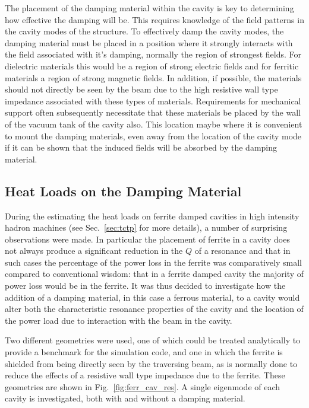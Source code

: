 The placement of the damping material within the cavity is key to determining how effective the damping will be. This requires knowledge of the field patterns in the cavity modes of the structure. To effectively damp the cavity modes, the damping material must be placed in a position where it strongly interacts with the field associated with it's damping, normally the region of strongest fields. For dielectric materials this would be a region of strong electric fields and for ferritic materials a region of strong magnetic fields. In addition, if possible, the materials should not directly be seen by the beam due to the high resistive wall type impedance associated with these types of materials. Requirements for mechanical support often subsequently necessitate that these materials be placed by the wall of the vacuum tank of the cavity also. This location maybe where it is convenient to mount the damping materials, even away from the location of the cavity mode if it can be shown that the induced fields will be absorbed by the damping material.

\subsection{Heat Loads on the Damping Material}

During the estimating the heat loads on ferrite damped cavities in high intensity hadron machines (see Sec.~\ref{sec:tctp} for more details), a number of surprising observations were made. In particular the placement of ferrite in a cavity does not always produce a significant reduction in the $Q$ of a resonance and that in such cases the percentage of the power loss in the ferrite was comparatively small compared to conventional wisdom: that in a ferrite damped cavity the majority of power loss would be in the ferrite. It was thus decided to investigate how the addition of a damping material, in this case a ferrous material, to a cavity would alter both the characteristic resonance properties of the cavity and the location of the power load due to interaction with the beam in the cavity.

Two different geometries were used, one of which could be treated analytically to provide a benchmark for the simulation code, and one in which the ferrite is shielded from being directly seen by the traversing beam, as is normally done to reduce the effects of a resistive wall type impedance due to the ferrite. These geometries are shown in Fig.~\ref{fig:ferr_cav_res}. A single eigenmode of each cavity is investigated, both with and without a damping material. 

